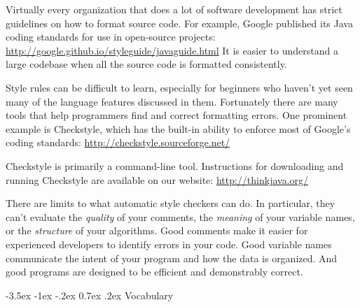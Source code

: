 \documentclass[12pt]{book}
\makeatletter
\renewcommand{\section}{\@startsection {section}{1}{\z@}%
    {-3.5ex \@plus -1ex \@minus -.2ex}%
    {0.7ex \@plus.2ex}%
    {\normalfont\Large\bfseries}}
\theoremstyle{exercise}
\makeatother
\begin{document}

Virtually every organization that does a lot of software development has strict guidelines on how to format source code.
For example, Google published its Java coding standards for use in open-source projects:
\url{http://google.github.io/styleguide/javaguide.html}
It is easier to understand a large codebase when all the source code is formatted consistently.


Style rules can be difficult to learn, especially for beginners who haven't yet seen many of the language features discussed in them.
Fortunately there are many tools that help programmers find and correct formatting errors.
One prominent example is Checkstyle, which has the built-in ability to enforce most of Google's coding standards:
\url{http://checkstyle.sourceforge.net/}

Checkstyle is primarily a command-line tool.
Instructions for downloading and running Checkstyle are available on our website: \url{http://thinkjava.org/}


There are limits to what automatic style checkers can do.
In particular, they can't evaluate the {\em quality} of your comments, the {\em meaning} of your variable names, or the {\em structure} of your algorithms.
Good comments make it easier for experienced developers to identify errors in your code.
Good variable names communicate the intent of your program and how the data is organized.
And good programs are designed to be efficient and demonstrably correct.


\section{Vocabulary}
\end{document}
